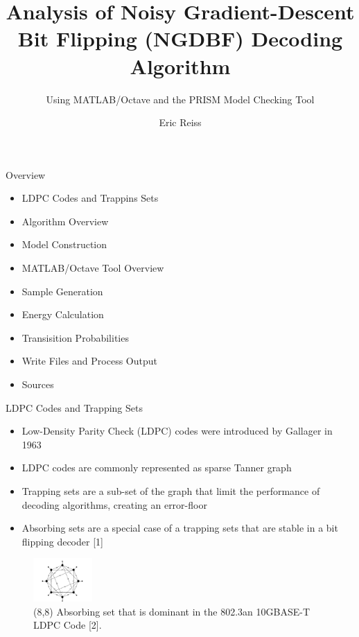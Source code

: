 \documentclass[10pt,ignorenonframetext,]{beamer}
\title{Analysis of Noisy Gradient-Descent Bit Flipping (NGDBF) Decoding
Algorithm}
\subtitle{Using MATLAB/Octave and the PRISM Model Checking Tool}
\author{Eric Reiss}
\date{}
\providecommand{\tightlist}{%
  \setlength{\itemsep}{0pt}\setlength{\parskip}{0pt}}
\begin{document}
\frame{\titlepage}

\begin{frame}{Overview}
\protect\hypertarget{overview}{}
\begin{itemize}[<+->]
\tightlist
\item
  LDPC Codes and Trappins Sets
\item
  Algorithm Overview
\item
  Model Construction
\item
  MATLAB/Octave Tool Overview
\item
  Sample Generation
\item
  Energy Calculation
\item
  Transisition Probabilities
\item
  Write Files and Process Output
\item
  Sources
\end{itemize}
\end{frame}

\begin{frame}{LDPC Codes and Trapping Sets}
\protect\hypertarget{ldpc-codes-and-trapping-sets}{}
\begin{itemize}[<+->]
\tightlist
\item
  Low-Density Parity Check (LDPC) codes were introduced by Gallager in
  1963
\item
  LDPC codes are commonly represented as sparse Tanner graph
\item
  Trapping sets are a sub-set of the graph that limit the performance of
  decoding algorithms, creating an error-floor
\item
  Absorbing sets are a special case of a trapping sets that are stable
  in a bit flipping decoder {[}1{]}
\end{itemize}

\begin{figure}
\centering
\includegraphics[width=0.2\textwidth,height=\textheight]{figures/8_8_absorbing.png}
\caption{(8,8) Absorbing set that is dominant in the 802.3an 10GBASE-T
LDPC Code {[}2{]}.}
\end{figure}
\end{frame}
\end{document}
